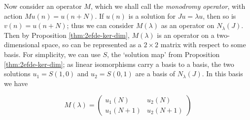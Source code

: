 \documentclass[../main.tex]{subfiles}
\begin{document}
Now consider an operator $M$, which we shall call the \emph{monodromy operator}, with action $Mu(n) = u(n+N)$. If $u(n)$ is a solution for $Ju = \lambda u$, then so is $v(n) = u(n+N)$; thus we can consider $M(\lambda)$ as an operator on $N_\lambda (J)$. Then by Proposition \ref{thm:2efde-ker-dim}, $M(\lambda)$ is an operator on a two-dimensional space, so can be represented as a $2 \times 2$ matrix with respect to some basis. For simplicity, we can use $S$, the `solution map' from Proposition \ref{thm:2efde-ker-dim}; as linear isomorphisms carry a basis to a basis, the two solutions $u_1 = S(1, 0)$ and $u_2 = S(0, 1)$ are a basis of $N_\lambda (J)$. In this basis we have

$$M(\lambda) =
\begin{pmatrix}
u_1(N) & u_2(N) \\
u_1(N+1) & u_2(N+1)
\end{pmatrix}
$$
\end{document}
